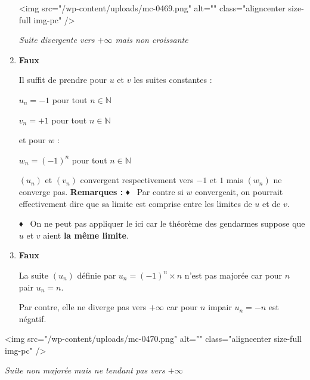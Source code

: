 \begin{corrige}
\begin{enumerate}
\begin{center}
\end{center}
          <img src="/wp-content/uploads/mc-0469.png" alt="" class="aligncenter size-full  img-pc" />
          \begin{center}\textit{Suite divergente vers $+\infty $ mais non croissante}\end{center}
          \item
          \textbf{Faux}
\par
          Il suffit de prendre pour $u$ et $v$ les suites constantes :
          \par
          $u_{n}=-1$ pour tout $n \in  \mathbb{N}$
          \par
          $v_{n}=+1$ pour tout $n \in  \mathbb{N}$
          \par
          et pour $w$ :
          \par
          $w_{n}=\left(-1\right)^{n}$ pour tout $n \in  \mathbb{N}$
          \par
          $\left(u_{n}\right)$ et $\left(v_{n}\right)$ convergent respectivement vers $-1$ et $1$ mais $\left(w_{n}\right)$ ne converge pas.
          \textbf{Remarques :}
          ♦  Par contre si $w$ convergeait, on pourrait effectivement dire que sa limite est comprise entre les limites de $u$ et de $v$.
          \par
          ♦  On ne peut pas appliquer le  ici car le théorème des gendarmes suppose que $u$ et $v$ aient \textbf{la même limite}.
          \item
          \textbf{Faux}
\par
          La suite $\left(u_{n}\right)$ définie par $u_{n}=\left(-1\right)^{n}\times n$ n'est pas majorée car pour $n$ pair $u_{n}=n$.
          \par
          Par contre, elle ne diverge pas vers $+\infty $ car pour $n$ impair  $u_{n}=-n$ est négatif.
     \end{enumerate}
     <img src="/wp-content/uploads/mc-0470.png" alt="" class="aligncenter size-full  img-pc" />
     \begin{center}\textit{Suite non majorée mais ne tendant pas vers $+\infty $}\end{center}
\end{corrige}

